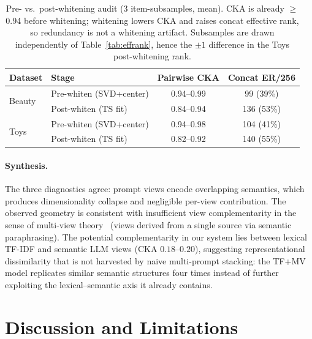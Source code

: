 \documentclass[sigconf,natbib=true,anonymous]{acmart}
\newcommand{\tfidf}{\textsc{TF-IDF}\xspace}
\newcommand{\llm}{\textsc{LLM}\xspace}
\newcommand{\tfmv}{\textsc{TF+MV}\xspace}
\begin{document}
\begin{table}[t]
\centering
\caption{%
Pre- vs.\ post-whitening audit (3 item-subsamples, mean).
CKA is already $\ge$0.94 before whitening; whitening lowers CKA and raises concat effective rank, so redundancy is not a whitening artifact.
Subsamples are drawn independently of Table~\ref{tab:effrank}, hence the $\pm 1$ difference in the Toys post-whitening rank.%
}
\label{tab:cka-prepost}
\small
\begin{tabular}{@{}llcc@{}}
\toprule
Dataset & Stage & Pairwise CKA & Concat ER/256 \\
\midrule
\multirow{2}{*}{Beauty}
 & Pre-whiten (SVD+center)  & 0.94--0.99 & 99 (39\%) \\
 & Post-whiten (TS fit)     & 0.84--0.94 & 136 (53\%) \\
\midrule
\multirow{2}{*}{Toys}
 & Pre-whiten (SVD+center)  & 0.94--0.98 & 104 (41\%) \\
 & Post-whiten (TS fit)     & 0.82--0.92 & 140 (55\%) \\
\bottomrule
\end{tabular}
\end{table}

\paragraph{Synthesis.}
The three diagnostics agree: prompt views encode overlapping semantics, which produces dimensionality collapse and negligible per-view contribution.
The observed geometry is consistent with insufficient view complementarity in the sense of multi-view theory~\cite{xu2013multiview} (views derived from a single source via semantic paraphrasing).
The potential complementarity in our system lies between lexical \tfidf and semantic \llm views (CKA $0.18$--$0.20$), suggesting representational dissimilarity that is not harvested by naive multi-prompt stacking: the \tfmv model replicates similar semantic structures four times instead of further exploiting the lexical--semantic axis it already contains.

\section{Discussion and Limitations}
\label{sec:discussion}
\end{document}
